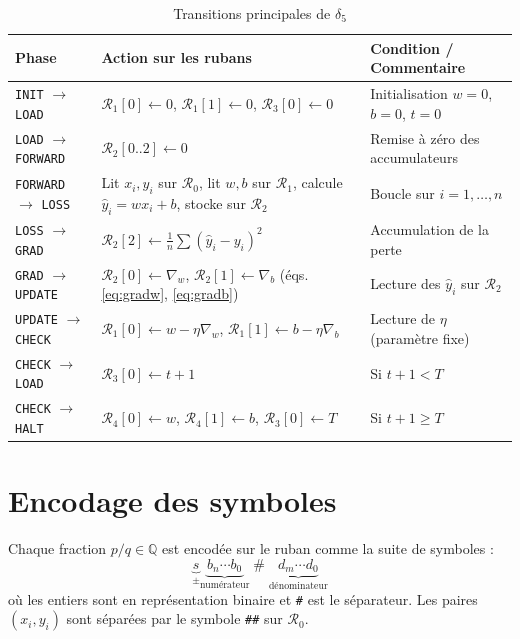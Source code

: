 \documentclass[12pt, a4paper, oneside]{report}
\newcommand{\state}[1]{\texttt{#1}}
\newcommand{\tape}[1]{\mathcal{R}_{#1}}
\begin{document}
\begin{table}[H]
  \centering
  \caption{Transitions principales de $\delta_5$}
  \label{tab:delta}
  \renewcommand{\arraystretch}{1.5}
  \small
  \begin{tabularx}{\textwidth}{l X X}
    \toprule
    \textbf{Phase} & \textbf{Action sur les rubans} & \textbf{Condition / Commentaire} \\
    \midrule
    \state{INIT} $\to$ \state{LOAD}
      & $\tape{1}[0] \leftarrow 0$, $\tape{1}[1] \leftarrow 0$, $\tape{3}[0] \leftarrow 0$
      & Initialisation $w=0$, $b=0$, $t=0$ \\
    \state{LOAD} $\to$ \state{FORWARD}
      & $\tape{2}[0..2] \leftarrow 0$
      & Remise à zéro des accumulateurs \\
    \state{FORWARD} $\to$ \state{LOSS}
      & Lit $x_i, y_i$ sur $\tape{0}$, lit $w,b$ sur $\tape{1}$, calcule $\hat{y}_i = wx_i+b$, stocke sur $\tape{2}$
      & Boucle sur $i = 1, \ldots, n$ \\
    \state{LOSS} $\to$ \state{GRAD}
      & $\tape{2}[2] \leftarrow \frac{1}{n}\sum(\hat{y}_i - y_i)^2$
      & Accumulation de la perte \\
    \state{GRAD} $\to$ \state{UPDATE}
      & $\tape{2}[0] \leftarrow \nabla_w$, $\tape{2}[1] \leftarrow \nabla_b$ (éqs. \ref{eq:gradw}, \ref{eq:gradb})
      & Lecture des $\hat{y}_i$ sur $\tape{2}$ \\
    \state{UPDATE} $\to$ \state{CHECK}
      & $\tape{1}[0] \leftarrow w - \eta \nabla_w$, $\tape{1}[1] \leftarrow b - \eta \nabla_b$
      & Lecture de $\eta$ (paramètre fixe) \\
    \state{CHECK} $\to$ \state{LOAD}
      & $\tape{3}[0] \leftarrow t + 1$
      & Si $t + 1 < T$ \\
    \state{CHECK} $\to$ \state{HALT}
      & $\tape{4}[0] \leftarrow w$, $\tape{4}[1] \leftarrow b$, $\tape{3}[0] \leftarrow T$
      & Si $t + 1 \geq T$ \\
    \bottomrule
  \end{tabularx}
\end{table}

\section{Encodage des symboles}

Chaque fraction $p/q \in \mathbb{Q}$ est encodée sur le ruban comme la suite de symboles :
\[
  \underbrace{s}_{{\scriptstyle\pm}} \underbrace{b_{n} \cdots b_0}_{\text{numérateur}} \;\texttt{\#}\; \underbrace{d_{m} \cdots d_0}_{\text{dénominateur}}
\]
où les entiers sont en représentation binaire et \texttt{\#} est le séparateur. Les paires $(x_i, y_i)$ sont séparées par le symbole \texttt{\#\#} sur $\tape{0}$.
\end{document}
